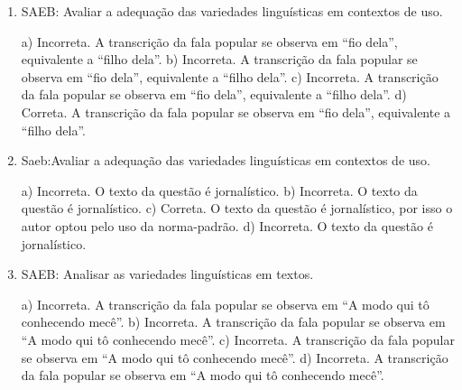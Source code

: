 \begin{enumerate}

\item
SAEB: Avaliar a adequação das variedades linguísticas em contextos de uso.

a) Incorreta. A transcrição da fala popular se observa em ``fio dela'', equivalente a ``filho dela''.
b) Incorreta. A transcrição da fala popular se observa em ``fio dela'', equivalente a ``filho dela''.
c) Incorreta. A transcrição da fala popular se observa em ``fio dela'', equivalente a ``filho dela''.
d) Correta. A transcrição da fala popular se observa em ``fio dela'', equivalente a ``filho dela''.

\item
Saeb:Avaliar a adequação das variedades linguísticas em contextos de
uso.

a) Incorreta. O texto da questão é jornalístico. 
b) Incorreta. O texto da questão é jornalístico. 
c) Correta. O texto da questão é jornalístico, por isso o autor optou pelo uso da norma-padrão. 
d) Incorreta. O texto da questão é jornalístico.

\item
SAEB: Analisar as variedades linguísticas em textos.

a) Incorreta. A transcrição da fala popular se observa em ``A modo qui tô conhecendo mecê''.
b) Incorreta. A transcrição da fala popular se observa em ``A modo qui tô conhecendo mecê''. 
c) Incorreta. A transcrição da fala popular se observa em ``A modo qui tô conhecendo mecê''. 
d) Incorreta. A transcrição da fala popular se observa em ``A modo qui tô conhecendo mecê''.

\end{enumerate}


